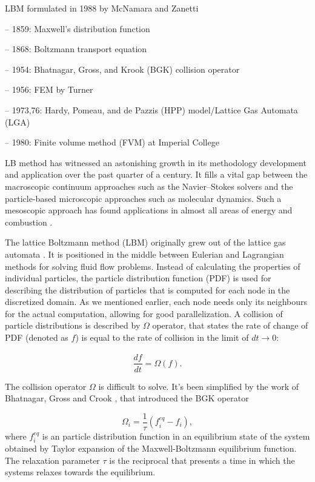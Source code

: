 LBM	formulated in 1988 by	McNamara and	Zanetti

– 1859:	Maxwell's	distribution	function	

– 1868:	Boltzmann	transport	equation	

– 1954:	Bhatnagar,	Gross,	and	Krook	(BGK)	collision	operator	

– 1956:	FEM	by	Turner	

– 1973,76:	Hardy,	Pomeau,	and	de	Pazzis	(HPP)	model/Lattice	
Gas	Automata	(LGA)	

– 1980:	Finite	volume	method	(FVM)	at	Imperial	College	

LB method has witnessed an astonishing growth in its methodology development and application over the past quarter of a century. It fills a vital gap between the macroscopic continuum approaches such as the Navier–Stokes solvers and the particle-based microscopic approaches such as molecular dynamics. Such a mesoscopic approach has found applications in almost all areas of energy and combustion \cite{liLatticeBoltzmannMethods2016a}.

The lattice Boltzmann method (LBM) originally grew out of the lattice gas automata \cite{succi2001lattice}. It is positioned in the middle between Eulerian and Lagrangian methods for solving fluid flow problems. Instead of calculating the properties of individual particles, the particle distribution function (PDF) is used for describing the distribution of particles that is computed for each node in the discretized domain. As we mentioned earlier, each node needs only its neighbours for the actual computation, allowing for good parallelization. A collision of particle distributions is described by $\Omega$ operator, that states the rate of change of PDF (denoted as $f$) is equal to the rate of collision in the limit of $dt \xrightarrow[]{} 0$:

\begin{equation}
	\label{eq:collision-operator}
	\frac{df}{dt} = \Omega(f).
\end{equation}

The collision operator $\Omega$ is difficult to solve. It's been simplified by the work of Bhatnagar, Gross and Crook \cite{bhatnagarModelCollisionProcesses1954}, that introduced the BGK operator

\begin{equation}
	\label{eq:bgk-operator}
	\Omega_i = \frac{1}{\tau}(f^{eq}_i - f_i),
\end{equation}
where $f^{eq}_i $ is an particle distribution function in an equilibrium state of the system obtained by Taylor expansion of the Maxwell-Boltzmann equilibrium function. The relaxation parameter $\tau$ is the reciprocal that presents a time in which the systems relaxes towards the equilibrium.

